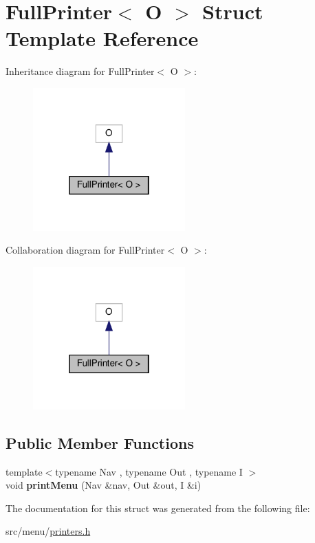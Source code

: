 \hypertarget{structFullPrinter}{}\section{Full\+Printer$<$ O $>$ Struct Template Reference}
\label{structFullPrinter}


Inheritance diagram for Full\+Printer$<$ O $>$\+:\nopagebreak
\begin{figure}[H]
\begin{center}
\leavevmode
\includegraphics[width=166pt]{structFullPrinter__inherit__graph}
\end{center}
\end{figure}


Collaboration diagram for Full\+Printer$<$ O $>$\+:\nopagebreak
\begin{figure}[H]
\begin{center}
\leavevmode
\includegraphics[width=166pt]{structFullPrinter__coll__graph}
\end{center}
\end{figure}
\subsection*{Public Member Functions}
\begin{DoxyCompactItemize}
\item 
\mbox{\label{structFullPrinter_af82b8646b09d2ddea62bfa85809f9377}} 
{\footnotesize template$<$typename Nav , typename Out , typename I $>$ }\\void {\bfseries print\+Menu} (Nav \&nav, Out \&out, I \&i)
\end{DoxyCompactItemize}


The documentation for this struct was generated from the following file\+:\begin{DoxyCompactItemize}
\item 
src/menu/\hyperlink{printers_8h}{printers.\+h}\end{DoxyCompactItemize}
